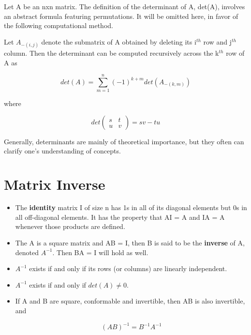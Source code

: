 Let A be an nxn matrix.  The definition of the determinant of A,
det(A), involves an abstract formula featuring permutations.  It will be
omitted here, in favor of the following computational method.

Let $A_{-(i,j)}$ denote the submatrix of A obtained by deleting its
i$^{th}$ row and j$^{th}$ column.  Then the determinant can be computed
recursively across the k$^{th}$ row of A as

\begin{equation}
det(A) =
\sum_{m=1}^n (-1)^{k+m} det(A_{-(k,m)})
\end{equation}

where

\begin{equation}
det
\left (
\begin{array}{cc}
s & t   \\
u & v 
\end{array}
\right ) = sv -tu
\end{equation}

Generally, determinants are mainly of theoretical importance, but they
often can clarify one's understanding of concepts.

\section{Matrix Inverse}

\begin{itemize}

\item The {\bf identity} matrix I of size n has 1s in all of its
diagonal elements but 0s in all off-diagonal elements.  It has the
property that AI = A and IA = A whenever those products are defined.

\item The A is a square matrix and AB = I, then B is said to be the
{\bf inverse} of A, denoted $A^{-1}$.  Then BA = I will hold as well.

\item $A^{-1}$ exists if and only if its rows (or columns) are
linearly independent.

\item $A^{-1}$ exists if and only if $det(A) \neq 0$.

\item If A and B are square, conformable and invertible, then AB is also
invertible, and

\begin{equation}
(AB)^{-1} = B^{-1} A^{-1}
\end{equation}

\end{itemize}

